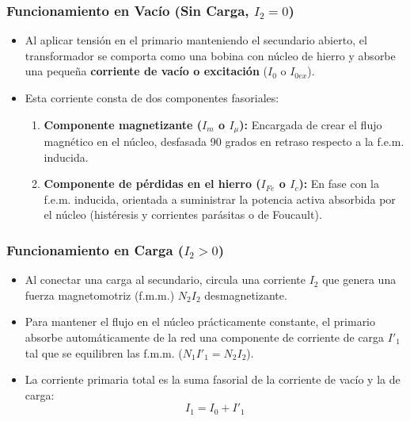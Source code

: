 \documentclass[12pt]{article}
\begin{document}
\subsubsection*{Funcionamiento en Vac\'io (Sin Carga, $I_2=0$)}
\begin{itemize}
    \item Al aplicar tensi\'on en el primario manteniendo el secundario abierto, el transformador se comporta como una bobina con n\'ucleo de hierro y absorbe una peque\~na \textbf{corriente de vac\'io o excitaci\'on} ($I_0$ o $I_{0ex}$).

    \item Esta corriente consta de dos componentes fasoriales:
    \begin{enumerate}
        \item \textbf{Componente magnetizante ($I_{m}$ o $I_{\mu}$):} Encargada de crear el flujo magn\'etico en el n\'ucleo, desfasada 90 grados en retraso respecto a la f.e.m. inducida.
        \item \textbf{Componente de p\'erdidas en el hierro ($I_{Fe}$ o $I_c$):} En fase con la f.e.m. inducida, orientada a suministrar la potencia activa absorbida por el n\'ucleo (hist\'eresis y corrientes par\'asitas o de Foucault).
    \end{enumerate}
\end{itemize}

\subsubsection*{Funcionamiento en Carga ($I_2>0$)}
\begin{itemize}
    \item Al conectar una carga al secundario, circula una corriente $I_2$ que genera una fuerza magnetomotriz (f.m.m.) $N_2I_2$ desmagnetizante.

    \item Para mantener el flujo en el n\'ucleo pr\'acticamente constante, el primario absorbe autom\'aticamente de la red una componente de corriente de carga $I'_1$ tal que se equilibren las f.m.m. ($N_1I'_1=N_2I_2$).

    \item La corriente primaria total es la suma fasorial de la corriente de vac\'io y la de carga:
    \[
        I_1=I_0+I'_1
    \]
\end{itemize}
\end{document}
